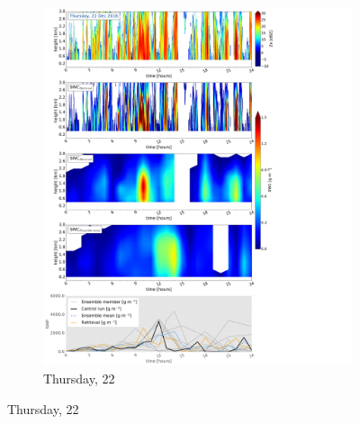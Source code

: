 \begin{figure}\ContinuedFloat
	\centering
	\begin{subfigure}[b]{0.8\textwidth}
		\includegraphics[trim={0.5cm 0.5cm 17.5cm .5cm},clip,width=\textwidth]{./fig_SWC/20161222}
		\caption{Thursday, \SI{22}{\dec}}\label{fig:SWC22}
	\end{subfigure}
\end{figure}
